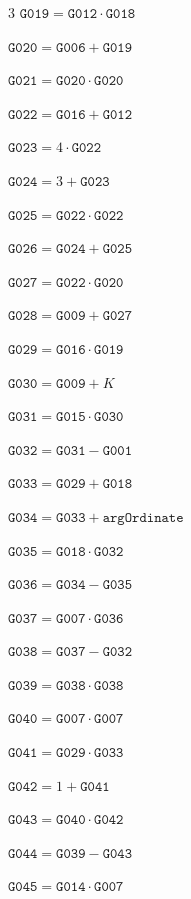\documentclass[10pt]{article}
\begin{document}
\begin{multicols}{3}
\noindent $\mathtt{G019}=\mathtt{G012}\cdot \mathtt{G018}$\par
\noindent $\mathtt{G020}=\mathtt{G006}+\mathtt{G019}$\par
\noindent $\mathtt{G021}=\mathtt{G020}\cdot \mathtt{G020}$\par
\noindent $\mathtt{G022}=\mathtt{G016}+\mathtt{G012}$\par
\noindent $\mathtt{G023}=4\cdot \mathtt{G022}$\par
\noindent $\mathtt{G024}=3+\mathtt{G023}$\par
\noindent $\mathtt{G025}=\mathtt{G022}\cdot \mathtt{G022}$\par
\noindent $\mathtt{G026}=\mathtt{G024}+\mathtt{G025}$\par
\noindent $\mathtt{G027}=\mathtt{G022}\cdot \mathtt{G020}$\par
\noindent $\mathtt{G028}=\mathtt{G009}+\mathtt{G027}$\par
\noindent $\mathtt{G029}=\mathtt{G016}\cdot \mathtt{G019}$\par
\noindent $\mathtt{G030}=\mathtt{G009}+K$\par
\noindent $\mathtt{G031}=\mathtt{G015}\cdot \mathtt{G030}$\par
\noindent $\mathtt{G032}=\mathtt{G031}-\mathtt{G001}$\par
\noindent $\mathtt{G033}=\mathtt{G029}+\mathtt{G018}$\par
\noindent $\mathtt{G034}=\mathtt{G033}+\mathtt{argOrdinate}$\par
\noindent $\mathtt{G035}=\mathtt{G018}\cdot \mathtt{G032}$\par
\noindent $\mathtt{G036}=\mathtt{G034}-\mathtt{G035}$\par
\noindent $\mathtt{G037}=\mathtt{G007}\cdot \mathtt{G036}$\par
\noindent $\mathtt{G038}=\mathtt{G037}-\mathtt{G032}$\par
\noindent $\mathtt{G039}=\mathtt{G038}\cdot \mathtt{G038}$\par
\noindent $\mathtt{G040}=\mathtt{G007}\cdot \mathtt{G007}$\par
\noindent $\mathtt{G041}=\mathtt{G029}\cdot \mathtt{G033}$\par
\noindent $\mathtt{G042}=1+\mathtt{G041}$\par
\noindent $\mathtt{G043}=\mathtt{G040}\cdot \mathtt{G042}$\par
\noindent $\mathtt{G044}=\mathtt{G039}-\mathtt{G043}$\par
\noindent $\mathtt{G045}=\mathtt{G014}\cdot \mathtt{G007}$\par

\end{multicols}
\end{document}
